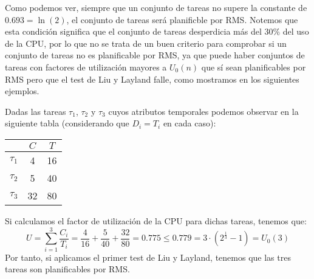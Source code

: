 Como podemos ver, siempre que un conjunto de tareas no supere la constante de $0.693 = \ln(2)$, el conjunto de tareas será planificble por RMS\@. Notemos que esta condición significa que el conjunto de tareas desperdicia más del $30\%$ del uso de la CPU, por lo que no se trata de un buen criterio para comprobar si un conjunto de tareas no es planificable por RMS, ya que puede haber conjuntos de tareas con factores de utilización mayores a $U_0(n)$ que sí sean planificables por RMS pero que el test de Liu y Layland falle, como mostramos en los siguientes ejemplos.

\begin{ejemplo}
    Dadas las tareas $\tau_1$, $\tau_2$ y $\tau_3$ cuyos atributos temporales podemos observar en la siguiente tabla (considerando que $D_i = T_i$ en cada caso):
    \begin{table}[H]
    \centering
    \begin{tabular}{|c|c|c|}
        \hline
        & $C$ & $T$ \\
        \hline
        $\tau_1$ & 4 & 16 \\
        \hline
        $\tau_2$ & 5 & 40 \\
        \hline
        $\tau_3$ & 32 & 80 \\
        \hline
    \end{tabular}
    \end{table}
    Si calculamos el factor de utilización de la CPU para dichas tareas, tenemos que:
    \begin{equation*}
        U = \sum_{i=1}^{3}\dfrac{C_i}{T_i} = \dfrac{4}{16} + \dfrac{5}{40} + \dfrac{32}{80} = 0.775 \leq 0.779 = 3\cdot \left(2^{\frac{1}{3}}-1\right) = U_0(3)
    \end{equation*}
    Por tanto, si aplicamos el primer test de Liu y Layland, tenemos que las tres tareas son planificables por RMS\@.
\end{ejemplo}

